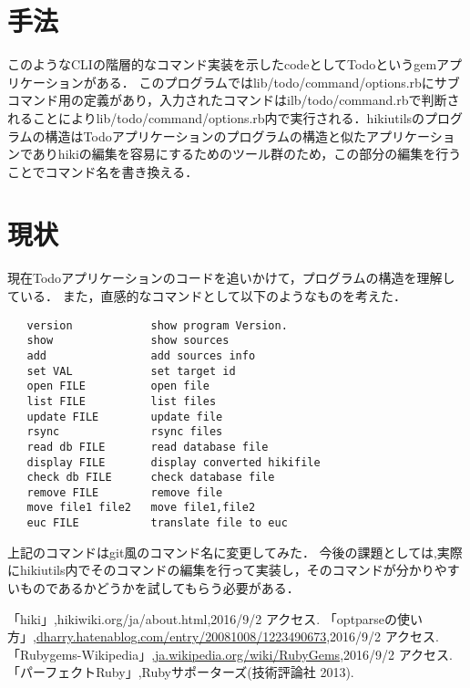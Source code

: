 \documentclass[a4j,twocolumn]{jsarticle}
\begin{document}
\section{手法}
このようなCLIの階層的なコマンド実装を示したcodeとしてTodoというgemアプリケーションがある\cite{PerfectRuby}．
このプログラムではlib/todo/command/options.rbにサブコマンド用の定義があり，入力されたコマンドはilb/todo/command.rbで判断されることによりlib/todo/command/options.rb内で実行される．hikiutilsのプログラムの構造はTodoアプリケーションのプログラムの構造と似たアプリケーションでありhikiの編集を容易にするためのツール群のため，この部分の編集を行うことでコマンド名を書き換える．

\section{現状}
現在Todoアプリケーションのコードを追いかけて，プログラムの構造を理解している．
また，直感的なコマンドとして以下のようなものを考えた．
\begin{verbatim}
   version            show program Version.
   show               show sources
   add                add sources info
   set VAL            set target id
   open FILE          open file
   list FILE          list files
   update FILE        update file
   rsync              rsync files
   read db FILE       read database file
   display FILE       display converted hikifile
   check db FILE      check database file
   remove FILE        remove file
   move file1 file2   move file1,file2
   euc FILE           translate file to euc
\end{verbatim}
上記のコマンドはgit風のコマンド名に変更してみた．
今後の課題としては,実際にhikiutils内でそのコマンドの編集を行って実装し，そのコマンドが分かりやすいものであるかどうかを試してもらう必要がある．

\begin{thebibliography}{9}
「hiki」,hikiwiki.org/ja/about.html,2016/9/2 アクセス.
「optparseの使い方」,\url{dharry.hatenablog.com/entry/20081008/1223490673},2016/9/2 アクセス.
「Rubygems-Wikipedia」,\url{ja.wikipedia.org/wiki/RubyGems},2016/9/2 アクセス.
「パーフェクトRuby」,Rubyサポーターズ(技術評論社 2013).
\end{thebibliography}
\end{document}

